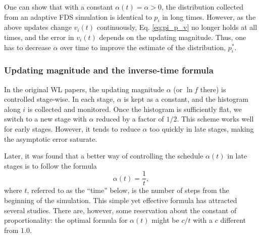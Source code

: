 \documentclass[reprint, floatfix]{revtex4-1}
\begin{document}
One can show that with a constant $\alpha(t) = \alpha > 0$,
the distribution collected from
an adaptive FDS simulation
is identical to $p_i$ in long times.
%
However, as the above updates
change $v_i(t)$ continuously,
Eq. \eqref{eq:pi_p_v} no longer holds
at all times,
and the error in $v_i(t)$
depends on the updating magnitude\cite{
  zhou2005, liang2005, laio2005, bussi2006, poulain2006, liang2007,
  morozov2007, zhou2008, morozov2009, crespo2010,
  atchade2011, fort2015}.
%
Thus, one has to decrease $\alpha$ over time
to improve the estimate of the distribution,
$p^*_i$. %





\subsubsection{Updating magnitude and the inverse-time formula}



In the original WL papers\cite{
wang2001, wang2001pre},
the updating magnitude $\alpha$
(or $\ln f$ there)
is controlled stage-wise.
%
In each stage, $\alpha$
is kept as a constant,
and the histogram along $i$
is collected and monitored.
%
Once the histogram is sufficiently flat,
we switch to a new stage
with $\alpha$ reduced by a factor of $1/2$\cite{
wang2001, wang2001pre}.
%
This scheme works well for early stages.
%
However, it tends to reduce $\alpha$
too quickly in late stages, making the asymptotic error
saturate\cite{belardinelli2007, belardinelli2007jcp, belardinelli2008}.


Later,
it was found that
a better way
of controlling the schedule $\alpha(t)$
in late stages
is to follow the formula
%
\begin{equation}
  \alpha(t) = \frac{1}{t},
  \label{eq:alpha_invt}
\end{equation}
%
where $t$,
referred to as the ``time'' below,
is the number of steps
from the beginning of the simulation.
%
This simple yet effective formula has attracted
several studies\cite{belardinelli2007, belardinelli2007jcp, belardinelli2008,
morozov2007, zhou2008, morozov2009,
komura2012, caparica2012, caparica2014}.
%
There are, however, some reservation about
the constant of proportionality:
the optimal formula for $\alpha(t)$
might be $c/t$ with a $c$
different from $1.0$\cite{
morozov2007, zhou2008, morozov2009}.
\end{document}
